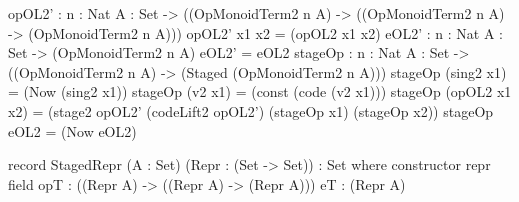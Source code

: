 \begin{togcode} 
 opOL2' : {n : Nat} {A : Set} -> 
      ((OpMonoidTerm2 n A) -> ((OpMonoidTerm2 n A) -> (OpMonoidTerm2 n A)))
  opOL2' x1 x2 = (opOL2 x1 x2) 
  eOL2' : {n : Nat} {A : Set} -> (OpMonoidTerm2 n A)
  eOL2'  = eOL2 
  stageOp : {n : Nat} {A : Set} -> 
       ((OpMonoidTerm2 n A) -> (Staged (OpMonoidTerm2 n A)))
  stageOp (sing2 x1) = (Now (sing2 x1)) 
  stageOp (v2 x1) = (const (code (v2 x1))) 
  stageOp (opOL2 x1 x2) = 
    (stage2 opOL2' (codeLift2 opOL2') (stageOp x1) (stageOp x2)) 
  stageOp eOL2 = (Now eOL2) 

  record StagedRepr (A : Set) (Repr : (Set -> Set)) : Set where
    constructor repr
    field
      opT : ((Repr A) -> ((Repr A) -> (Repr A)))
      eT : (Repr A)  
\end{togcode} 
